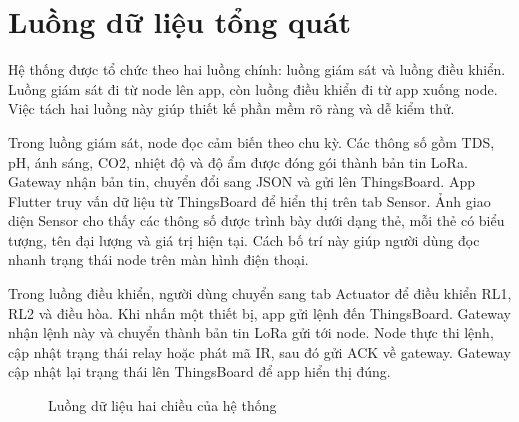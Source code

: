\section{Luồng dữ liệu tổng quát}
Hệ thống được tổ chức theo hai luồng chính: luồng giám sát và luồng điều khiển. Luồng giám sát đi từ node lên app, còn luồng điều khiển đi từ app xuống node. Việc tách hai luồng này giúp thiết kế phần mềm rõ ràng và dễ kiểm thử.

Trong luồng giám sát, node đọc cảm biến theo chu kỳ. Các thông số gồm TDS, pH, ánh sáng, CO2, nhiệt độ và độ ẩm được đóng gói thành bản tin LoRa. Gateway nhận bản tin, chuyển đổi sang JSON và gửi lên ThingsBoard. App Flutter truy vấn dữ liệu từ ThingsBoard để hiển thị trên tab Sensor. Ảnh giao diện Sensor cho thấy các thông số được trình bày dưới dạng thẻ, mỗi thẻ có biểu tượng, tên đại lượng và giá trị hiện tại. Cách bố trí này giúp người dùng đọc nhanh trạng thái node trên màn hình điện thoại.

Trong luồng điều khiển, người dùng chuyển sang tab Actuator để điều khiển RL1, RL2 và điều hòa. Khi nhấn một thiết bị, app gửi lệnh đến ThingsBoard. Gateway nhận lệnh này và chuyển thành bản tin LoRa gửi tới node. Node thực thi lệnh, cập nhật trạng thái relay hoặc phát mã IR, sau đó gửi ACK về gateway. Gateway cập nhật lại trạng thái lên ThingsBoard để app hiển thị đúng.

\begin{figure}[h!]
    \centering
    \caption{Luồng dữ liệu hai chiều của hệ thống}
    \label{fig:data_control_flow}
\end{figure}

